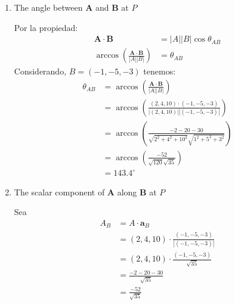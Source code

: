 \begin{problema}
\begin{enumerate}
        \item The angle between $\mathbf{A}$ and $\mathbf{B}$ at $P$
        \begin{sol}
            Por la propiedad: 
            \begin{align*}
                \mathbf{A}\cdot \mathbf{B} &= |A||B|\cos\theta_{AB}\\
                \arccos\left(\frac{\mathbf{A}\cdot \mathbf{B}}{|A||B|}\right) &=\theta_{AB}
            \end{align*}
            Considerando, $B=(-1,-5,-3)$ tenemos: 
            \begin{align*}
                \theta_{AB} &= \arccos\left(\frac{\mathbf{A}\cdot \mathbf{B}}{|A||B|}\right)\\
                &=\arccos\left(\frac{(2,4,10)\cdot (-1,-5,-3)}{|(2,4,10)||(-1,-5,-3)|}\right)\\
                &= \arccos\left(\frac{-2-20-30}{\sqrt{2^2+4^2+10^2}\sqrt{1^2+5^2+3^2}}\right)\\
                &= \arccos\left(\frac{-52}{\sqrt{120}\sqrt{35}}\right)\\
                &= 143.4^\circ 
            \end{align*}
        \end{sol}
        
        \item The scalar component of $\mathbf{A}$ along $\mathbf{B}$ at $P$
        \begin{sol}
            Sea 
            \begin{align*}
                A_B &= A\cdot \mathbf{a}_B\\
                 &= (2,4,10)\cdot\frac{(-1,-5,-3)}{|(-1,-5,-3)|}\\
                  &= (2,4,10)\cdot\frac{(-1,-5,-3)}{\sqrt{35}}\\
                  &= \frac{-2-20-30}{\sqrt{35}}\\
                  &= \frac{-52}{\sqrt{35}}
            \end{align*}
        \end{sol}
    \end{enumerate}

\end{problema}


